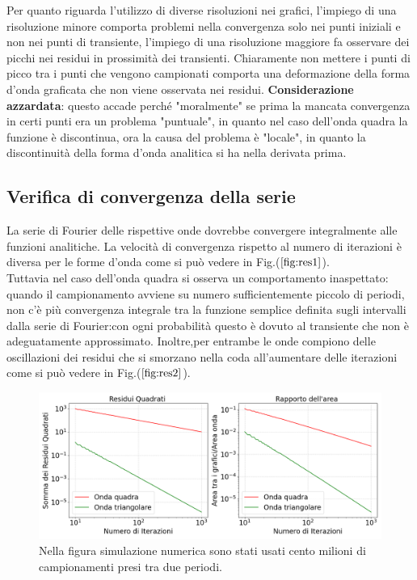 \documentclass{article}
\begin{document}
        Per quanto riguarda l'utilizzo di diverse risoluzioni nei grafici, l'impiego di una risoluzione 
        minore comporta problemi nella convergenza solo nei punti iniziali e non nei punti di transiente,
        l'impiego di una risoluzione maggiore fa osservare dei picchi nei residui in prossimità dei transienti.
        Chiaramente non mettere i punti di picco tra i punti che vengono campionati 
        comporta una deformazione della forma d'onda graficata che non viene osservata 
        nei residui.
        \textbf{Considerazione azzardata}: questo accade perché "moralmente" se prima la mancata convergenza in certi 
        punti era un problema "puntuale", in quanto nel caso dell'onda quadra la funzione è discontinua, 
        ora la causa del problema è "locale", in quanto la discontinuità della forma d'onda analitica 
        si ha nella derivata prima.




    \subsection{Verifica di convergenza della serie}
    \label{sez:residui}
       
        La serie di Fourier delle rispettive onde dovrebbe convergere integralmente alle funzioni analitiche.
        La velocità di convergenza rispetto al numero di iterazioni
        è diversa per le forme d'onda come si può vedere in Fig.($\ref{fig:res1}$).\\ 
        Tuttavia nel caso dell'onda quadra si osserva un comportamento inaspettato:
        quando il campionamento avviene su numero sufficientemente
        piccolo di periodi,  non c'è più convergenza integrale tra la funzione semplice definita sugli 
        intervalli dalla serie di Fourier:con ogni probabilità questo è dovuto al transiente che non è 
        adeguatamente approssimato.
        Inoltre,per entrambe le onde compiono delle oscillazioni dei residui che si
        smorzano nella coda all'aumentare delle iterazioni come 
        si può vedere in Fig.($\ref{fig:res2}$).
        

        \begin{figure}[H]
            \centering
            \includegraphics[width=1.2\textwidth]{residuals1.png} %
            \caption{Nella figura simulazione numerica sono stati usati cento milioni di campionamenti presi tra due periodi.}
            \label{fig:res1}
        \end{figure}
\end{document}
